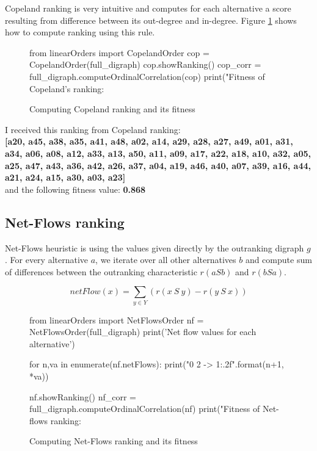 \documentclass[a4paper]{article}
\begin{document}
Copeland ranking is very intuitive and computes for each alternative a score resulting from difference between its out-degree and in-degree. Figure \ref{lst:copeland} shows how to compute ranking using this rule.

\begin{figure}[H]
	\begin{center}
		\begin{python}
from linearOrders import CopelandOrder
cop = CopelandOrder(full_digraph)
cop.showRanking()
cop_corr = full_digraph.computeOrdinalCorrelation(cop)
print("Fitness of Copeland's ranking: %
		\end{python}
	\end{center}
	\caption{Computing Copeland ranking and its fitness}
	\label{lst:copeland}
\end{figure}

I received this ranking from Copeland ranking:\\

\textbf{[a20, a45, a38, a35, a41, a48, a02, a14, a29, a28, a27, a49, a01, a31, a34, a06, a08, a12, a33, a13, a50, a11, a09, a17, a22, a18, a10, a32, a05, a25, a47, a43, a36, a42, a26, a37, a04, a19, a46, a40, a07, a39, a16, a44, a21, a24, a15, a30, a03, a23]}\\

and the following fitness value: \textbf{0.868}

\subsection{Net-Flows ranking}

Net-Flows heuristic is using the values given directly by the outranking digraph $g$. For every alternative $a$, we iterate over all other alternatives $b$ and compute sum of differences between the outranking characteristic $r (a S b)$ and $r (b S a)$.

$$ netFlow(x) = \sum_{y \in Y}(r(x\ S\ y) - r(y\ S\ x))$$

\begin{figure}[H]
	\begin{center}
		\begin{python}
from linearOrders import NetFlowsOrder
nf = NetFlowsOrder(full_digraph)
print('Net flow values for each alternative')

for n,va in enumerate(nf.netFlows):
	print("{0} {2} -> {1:.2f}".format(n+1, *va))

nf.showRanking()
nf_corr = full_digraph.computeOrdinalCorrelation(nf)
print("Fitness of Net-flows ranking: %
		\end{python}
	\end{center}
	\caption{Computing Net-Flows ranking and its fitness}
	\label{lst:netflows}
\end{figure}
\end{document}
